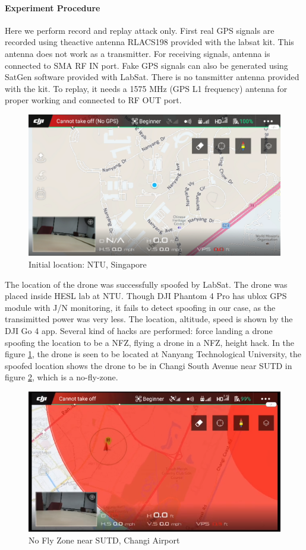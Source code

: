\documentclass[conference]{IEEEtran}
\begin{document}
\paragraph*{Experiment Procedure}
Here we perform record
and replay attack only. First real GPS signals are recorded using theactive antenna RLACS198 provided with the labsat kit. This antenna does not work as a transmitter.
For receiving signals, antenna is connected to SMA RF IN port.
Fake GPS signals can also be generated using SatGen software provided with LabSat. There is no tansmitter antenna provided with the kit. To replay, it needs a 1575 MHz (GPS L1 frequency) antenna for proper working and connected to RF OUT port.
\\
\begin{figure}[h!]
	\centering
	\includegraphics[width=0.9\columnwidth]{ntu}
	\caption{Initial location: NTU, Singapore}
	\label{fig:ntu}
\end{figure}
The location of the drone was successfully spoofed by LabSat. The drone was placed inside HESL lab at NTU. Though DJI Phantom 4 Pro has
ublox GPS module with J/N monitoring, it fails to detect spoofing in our case, as the transimitted power was very less. The location, altitude, speed is shown by the DJI Go 4 app.
Several kind of hacks are performed: force landing a drone spoofing the location to be a NFZ, flying a drone in a NFZ, height hack.
In the figure \ref{fig:ntu}, the drone is seen to be located at Nanyang Technological University, the spoofed location shows the drone to be in Changi South Avenue near SUTD in figure \ref{fig:nfz}, which is a no-fly-zone.
\begin{figure}[h!]
	\centering
	\includegraphics[width=0.9\columnwidth]{nfz}
	\caption{No Fly Zone near SUTD, Changi Airport}
	\label{fig:nfz}
\end{figure}
\end{document}
